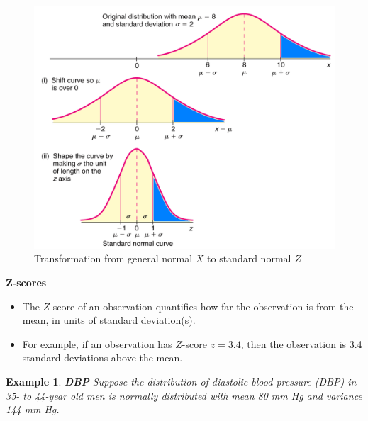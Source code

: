 \documentclass[12pt]{amsart}
\newtheorem{example}[theorem]{Example}
\newcommand{\m}{\mu}
\newcommand{\s}{\sigma}
\newcommand{\bP}{\mathbb{P}}
\begin{document}
{%
\begin{figure}[h!]
  \includegraphics[width=5in]{img/X_to_Z_transformation_Brase.png}
  \caption{Transformation from general normal $X$ to standard normal $Z$}
\end{figure}


\textbf{Z-scores} \newline

%
%

\vfill 

\begin{itemize}
\item The $Z$-score of an observation quantifies how far the observation is from the mean, in units of standard deviation(s). 
\item For example, if an observation has $Z$-score $z = 3.4$, then the observation is 3.4 standard deviations above the mean.
\end{itemize}



\newpage
\begin{example}  \textbf{DBP} \newline
Suppose the distribution of diastolic blood pressure (DBP) in 35- to 44-year old men is normally distributed with mean 80 mm Hg and variance 144 mm Hg. 


\end{example}}
\end{document}
